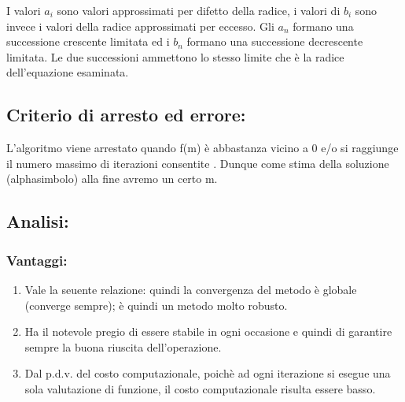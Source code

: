 \documentclass[a4paper,11pt]{article}
\begin{document}
I valori $a_i$ sono valori approssimati per difetto della radice, i valori di $b_i$ sono invece i valori della radice approssimati per eccesso. 
Gli $a_n$ formano una successione crescente limitata ed i $b_n$ formano una successione decrescente limitata.
Le due successioni ammettono lo stesso limite che è la radice dell'equazione esaminata.

\subsection{Criterio di arresto ed errore:}

L'algoritmo viene arrestato quando f(m) è abbastanza vicino a 0 e/o si raggiunge il numero massimo di iterazioni consentite .
Dunque come stima della soluzione (alphasimbolo)  alla fine avremo un certo m. 

\subsection {Analisi:}
\subsubsection{Vantaggi:}
\begin{enumerate}
\item Vale la seuente relazione:
quindi la convergenza del metodo è globale (converge sempre); è quindi un metodo molto robusto.
\item  Ha il notevole pregio di essere stabile in ogni occasione e quindi di garantire sempre la buona riuscita dell'operazione.
\item Dal p.d.v. del costo computazionale, poichè ad ogni iterazione si esegue una sola valutazione di funzione, il costo computazionale risulta essere basso. 

\end{enumerate}
\end{document}
